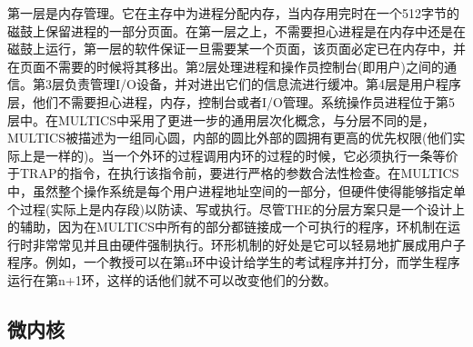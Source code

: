 	第一层是内存管理。它在主存中为进程分配内存，当内存用完时在一个512字节的磁鼓上保留进程的一部分页面。在第一层之上，不需要担心进程是在内存中还是在磁鼓上运行，第一层的软件保证一旦需要某一个页面，该页面必定已在内存中，并在页面不需要的时候将其移出。第2层处理进程和操作员控制台(即用户)之间的通信。第3层负责管理I/O设备，并对进出它们的信息流进行缓冲。第4层是用户程序层，他们不需要担心进程，内存，控制台或者I/O管理。系统操作员进程位于第5层中。在MULTICS中采用了更进一步的通用层次化概念，与分层不同的是，MULTICS被描述为一组同心圆，内部的圆比外部的圆拥有更高的优先权限(他们实际上是一样的)。当一个外环的过程调用内环的过程的时候，它必须执行一条等价于TRAP的指令，在执行该指令前，要进行严格的参数合法性检查。在MULTICS中，虽然整个操作系统是每个用户进程地址空间的一部分，但硬件使得能够指定单个过程(实际上是内存段)以防读、写或执行。尽管THE的分层方案只是一个设计上的辅助，因为在MULTICS中所有的部分都链接成一个可执行的程序，环机制在运行时非常常见并且由硬件强制执行。环形机制的好处是它可以轻易地扩展成用户子程序。例如，一个教授可以在第n环中设计给学生的考试程序并打分，而学生程序运行在第n+1环，这样的话他们就不可以改变他们的分数。
	
	\subsection{微内核}
	

